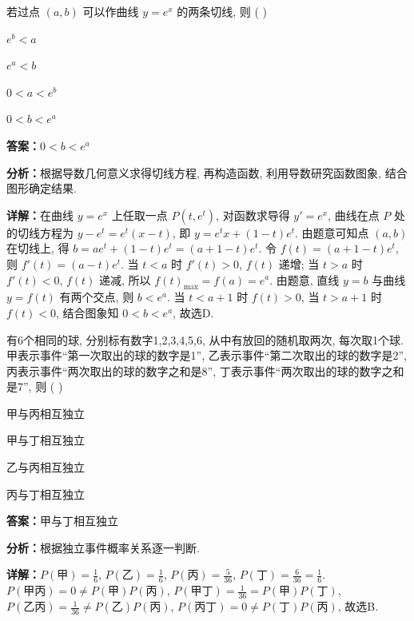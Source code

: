 \begin{question}[points=5]
若过点 $(a,b)$ 可以作曲线 $y = e^x$ 的两条切线, 则 ( )
\begin{choices}
  \item $e^b < a$
  \item $e^a < b$
  \item $0 < a < e^b$
  \item $0 < b < e^a$
\end{choices}
\begin{solution}
\textbf{答案：}$0 < b < e^a$

\textbf{分析：}根据导数几何意义求得切线方程, 再构造函数, 利用导数研究函数图象, 结合图形确定结果.

\textbf{详解：}在曲线 $y = e^x$ 上任取一点 $P(t, e^t)$, 对函数求导得 $y' = e^x$, 曲线在点 $P$ 处的切线方程为 $y - e^t = e^t(x - t)$, 即 $y = e^t x + (1 - t)e^t$. 由题意可知点 $(a,b)$ 在切线上, 得 $b = ae^t + (1 - t)e^t = (a+1-t)e^t$. 令 $f(t) = (a+1-t)e^t$, 则 $f'(t) = (a - t)e^t$. 当 $t < a$ 时 $f'(t) > 0$, $f(t)$ 递增; 当 $t > a$ 时 $f'(t) < 0$, $f(t)$ 递减, 所以 $f(t)_{\max} = f(a) = e^a$. 由题意, 直线 $y = b$ 与曲线 $y = f(t)$ 有两个交点, 则 $b < e^a$. 当 $t < a+1$ 时 $f(t) > 0$, 当 $t > a+1$ 时 $f(t) < 0$, 结合图象知 $0 < b < e^a$, 故选D.
\end{solution}
\end{question}

\begin{question}[points=5]
有6个相同的球, 分别标有数字1,2,3,4,5,6, 从中有放回的随机取两次, 每次取1个球. 甲表示事件“第一次取出的球的数字是1”, 乙表示事件“第二次取出的球的数字是2”, 丙表示事件“两次取出的球的数字之和是8”, 丁表示事件“两次取出的球的数字之和是7”, 则 ( )
\begin{choices}
  \item 甲与丙相互独立
  \item 甲与丁相互独立
  \item 乙与丙相互独立
  \item 丙与丁相互独立
\end{choices}
\begin{solution}
\textbf{答案：}甲与丁相互独立

\textbf{分析：}根据独立事件概率关系逐一判断.

\textbf{详解：}$P(\text{甲}) = \frac{1}{6}$, $P(\text{乙}) = \frac{1}{6}$, $P(\text{丙}) = \frac{5}{36}$, $P(\text{丁}) = \frac{6}{36} = \frac{1}{6}$. $P(\text{甲丙}) = 0 \neq P(\text{甲})P(\text{丙})$, $P(\text{甲丁}) = \frac{1}{36} = P(\text{甲})P(\text{丁})$, $P(\text{乙丙}) = \frac{1}{36} \neq P(\text{乙})P(\text{丙})$, $P(\text{丙丁}) = 0 \neq P(\text{丁})P(\text{丙})$, 故选B.
\end{solution}
\end{question}

